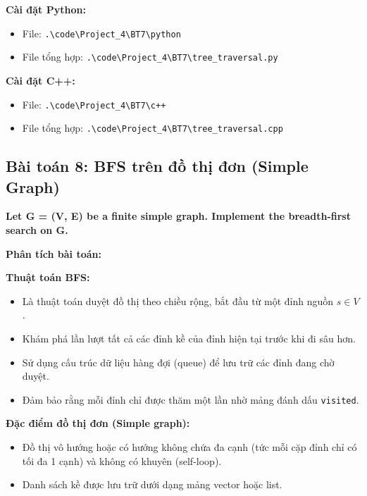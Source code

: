 \documentclass[12pt,a4paper]{article}
\begin{document}
\textbf{Cài đặt Python:}
\begin{itemize}[label=\textbullet]
    \item File: \texttt{.\textbackslash code\textbackslash Project\_4\textbackslash BT7\textbackslash python}
   \item File tổng hợp: \texttt{.\textbackslash code\textbackslash Project\_4\textbackslash BT7\textbackslash tree\_traversal.py}
\end{itemize}

\textbf{Cài đặt C++:}
\begin{itemize}[label=\textbullet]
    \item File: \texttt{.\textbackslash code\textbackslash Project\_4\textbackslash BT7\textbackslash c++}
   \item File tổng hợp: \texttt{.\textbackslash code\textbackslash Project\_4\textbackslash BT7\textbackslash tree\_traversal.cpp}
\end{itemize}



\newpage
\subsection{Bài toán 8: BFS trên đồ thị đơn (Simple Graph)}

\begin{problembox}
    \textbf{Let G = (V, E) be a finite simple graph. Implement the breadth-first search on G.} 
\end{problembox}

\textbf{Phân tích bài toán:}
\vspace{0.5cm}

\textbf{Thuật toán BFS:} 

\begin{itemize}[label=\textbullet]
    \item Là thuật toán duyệt đồ thị theo chiều rộng, bắt đầu từ một đỉnh nguồn $ s \in V $.
    \item Khám phá lần lượt tất cả các đỉnh kề của đỉnh hiện tại trước khi đi sâu hơn.
    \item Sử dụng cấu trúc dữ liệu hàng đợi (queue) để lưu trữ các đỉnh đang chờ duyệt.
    \item Đảm bảo rằng mỗi đỉnh chỉ được thăm một lần nhờ mảng đánh dấu \texttt{visited}.
\end{itemize}

\textbf{Đặc điểm đồ thị đơn (Simple graph):}
\begin{itemize}[label=\textbullet]
    \item Đồ thị vô hướng hoặc có hướng không chứa đa cạnh (tức mỗi cặp đỉnh chỉ có tối đa 1 cạnh) và không có khuyên (self-loop).
    \item Danh sách kề được lưu trữ dưới dạng mảng vector hoặc list.
\end{itemize}
\end{document}
